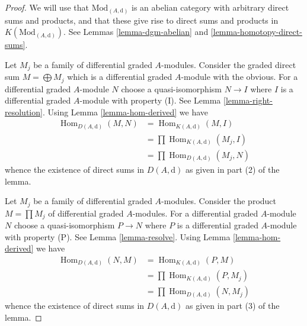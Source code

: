 \documentclass{stacks-project}
\theoremstyle{plain}
\theoremstyle{definition}
\theoremstyle{remark}
\numberwithin{equation}{subsection}
\def\Hom{\mathop{\mathrm{Hom}}\nolimits}
\begin{document}
\begin{proof}
We will use that $\text{Mod}_{(A, \text{d})}$ is an abelian category
with arbitrary direct sums and products, and that these give rise
to direct sums and products in $K(\text{Mod}_{(A, \text{d})})$.
See Lemmas \ref{lemma-dgm-abelian} and \ref{lemma-homotopy-direct-sums}.

\medskip\noindent
Let $M_j$ be a family of differential graded $A$-modules.
Consider the graded direct sum $M = \bigoplus M_j$ which is a
differential graded $A$-module with the obvious.
For a differential graded $A$-module $N$ choose a quasi-isomorphism
$N \to I$ where $I$ is a differential graded $A$-module with property (I).
See Lemma \ref{lemma-right-resolution}.
Using Lemma \ref{lemma-hom-derived} we have
\begin{align*}
\Hom_{D(A, \text{d})}(M, N)
& =
\Hom_{K(A, \text{d})}(M, I) \\
& =
\prod \Hom_{K(A, \text{d})}(M_j, I) \\
& =
\prod \Hom_{D(A, \text{d})}(M_j, N)
\end{align*}
whence the existence of direct sums in $D(A, \text{d})$ as given in
part (2) of the lemma.

\medskip\noindent
Let $M_j$ be a family of differential graded $A$-modules.
Consider the product $M = \prod M_j$ of differential graded $A$-modules.
For a differential graded $A$-module $N$ choose a quasi-isomorphism
$P \to N$ where $P$ is a differential graded $A$-module with property (P).
See Lemma \ref{lemma-resolve}.
Using Lemma \ref{lemma-hom-derived} we have
\begin{align*}
\Hom_{D(A, \text{d})}(N, M)
& =
\Hom_{K(A, \text{d})}(P, M) \\
& =
\prod \Hom_{K(A, \text{d})}(P, M_j) \\
& =
\prod \Hom_{D(A, \text{d})}(N, M_j)
\end{align*}
whence the existence of direct sums in $D(A, \text{d})$ as given in
part (3) of the lemma.
\end{proof}
\end{document}
